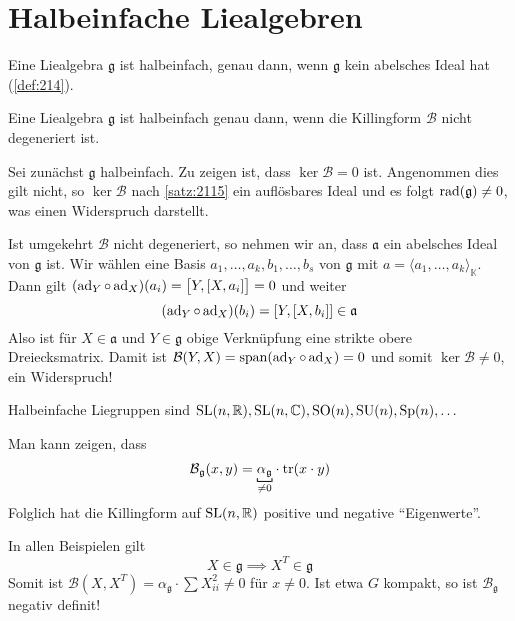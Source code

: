 \section{Halbeinfache Liealgebren} %
\label{sec:22}

\begin{erinnerung}[{name=[halbeinfach]}]
	Eine Liealgebra $\mathfrak{g}$ ist halbeinfach, genau dann, wenn $\mathfrak{g}$ kein abelsches Ideal hat (\ref{def:214}).
\end{erinnerung}

\begin{satz}[{name={Cartan}}]
	Eine Liealgebra $\mathfrak{g}$ ist halbeinfach genau dann, wenn die Killingform $\mathcal{B}$ nicht degeneriert ist.
\end{satz}
\begin{beweis}
	Sei zunächst $\mathfrak{g}$ halbeinfach.
	Zu zeigen ist, dass $\ker \mathcal{B}= 0$ ist.
	Angenommen dies gilt nicht, so $\ker \mathcal{B}$ nach \autoref{satz:2115} ein auflösbares Ideal und es folgt $\rad(\mathfrak{g}) \neq 0$, was einen Widerspruch darstellt.
	
	Ist umgekehrt $\mathcal{B}$ nicht degeneriert, so nehmen wir an, dass $\mathfrak{a}$ ein abelsches Ideal von $\mathfrak{g}$ ist.
	Wir wählen eine Basis $a_1, \ldots ,a_k, b_1, \ldots ,b_s$ von $\mathfrak{g}$ mit $a = \langle a_1, \ldots , a_k\rangle_\mathbb{K}$.
	Dann gilt $(\ad_Y \circ \ad_X)(a_i) = \benbrace[\big]{Y,\benbrace*{X,a_i}} = 0$ und weiter
	\[
		\enbrace*{\ad_Y \circ \ad_X}(b_i) = \benbrace*{Y, \benbrace*{X,b_i}} \in  \mathfrak{a}
	\]
	Also ist für $X \in \mathfrak{a}$ und $Y \in \mathfrak{g}$ obige Verknüpfung eine strikte obere Dreiecksmatrix.
	Damit ist $\mathcal{B}(Y,X)= \Span (\ad_Y \circ \ad_X)=0$ und somit $\ker \mathcal{B} \neq 0$, ein Widerspruch!
\end{beweis}

Halbeinfache Liegruppen sind $\SL(n,\mathbb{R}), \SL(n,\mathbb{C}), \SO(n), \SU(n), \Sp(n), \ldots $

Man kann zeigen, dass 
\[
	\mathcal{B}_{\mathfrak{g}} \enbrace*{x,y} = \Underbracket{\alpha_\mathfrak{g}}{\neq 0} \cdot \tr(x \cdot y)
\]
Folglich hat die Killingform auf $\SL(n,\mathbb{R})$ positive und negative \enquote{Eigenwerte}.

In allen Beispielen gilt
\[
	X \in \mathfrak{g} \implies X^T \in \mathfrak{g}
\]
Somit ist $\mathcal{B}(X,X^T) = \alpha_\mathfrak{g} \cdot \sum X_{ii}^2 \neq 0$ für $x\neq 0$.
Ist etwa $G$ kompakt, so ist $\mathcal{B}_\mathfrak{g}$ negativ definit!

